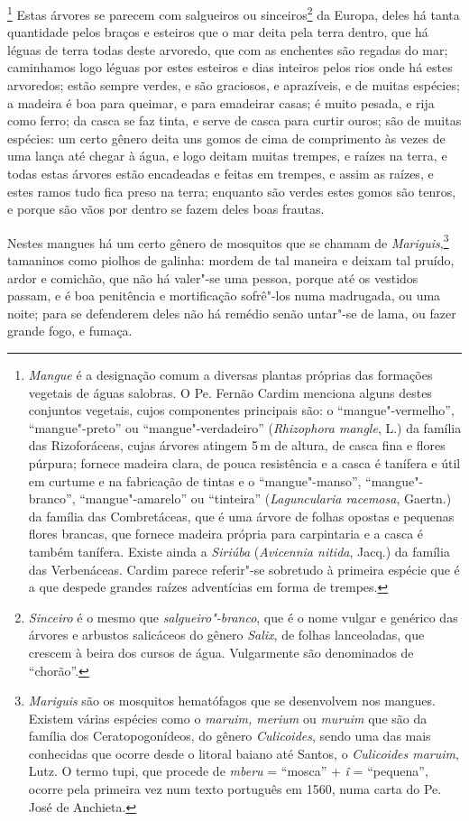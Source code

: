 \footnote{ \textit{Mangue} é a designação
comum a diversas plantas próprias das formações vegetais de águas
salobras. O Pe. Fernão Cardim menciona alguns destes conjuntos
vegetais, cujos componentes principais são: o ``mangue"-vermelho'', 
``mangue"-preto'' ou ``mangue"-verdadeiro'' (\textit{Rhizophora mangle}, L.)
da família das Rizoforáceas, cujas árvores atingem 5\,m de altura, de
casca fina e flores púrpura; fornece madeira clara, de pouca
resistência e a casca é tanífera e útil em curtume e na fabricação de
tintas e o ``mangue"-manso'', ``mangue"-branco'', ``mangue"-amarelo'' ou
``tinteira'' (\textit{Laguncularia racemosa}, Gaertn.) da família das
Combretáceas, que é uma árvore de folhas opostas e pequenas flores
brancas, que fornece madeira própria para carpintaria e a casca é
também tanífera. Existe ainda a \textit{Siriúba} (\textit{Avicennia
nitida}, Jacq.) da família das Verbenáceas. Cardim parece referir"-se
sobretudo à primeira espécie que é a que despede grandes raízes
adventícias em forma de trempes.} Estas árvores se parecem
com salgueiros ou sinceiros\footnote{ \textit{Sinceiro} é o mesmo que
\textit{salgueiro"-branco}, que é o nome vulgar e genérico das árvores e
arbustos salicáceos do gênero \textit{Salix}, de folhas lanceoladas,
que crescem à beira dos cursos de água. Vulgarmente são denominados de
``chorão''.} da Europa, deles há tanta quantidade pelos braços e esteiros
que o mar deita pela terra dentro, que há léguas de terra todas deste
arvoredo, que com as enchentes são regadas do mar; caminhamos logo
léguas por estes esteiros e dias inteiros pelos rios onde há estes
arvoredos; estão sempre verdes, e são graciosos, e aprazíveis, e de
muitas espécies; a madeira é boa para queimar, e para emadeirar casas;
é muito pesada, e rija como ferro; da casca se faz tinta, e serve de
casca para curtir ouros; são de muitas espécies: um certo gênero deita
uns gomos de cima de comprimento às vezes de uma lança até chegar à
água, e logo deitam muitas trempes, e raízes na terra, e todas estas
árvores estão encadeadas e feitas em trempes, e assim as raízes, e
estes ramos tudo fica preso na terra; enquanto são verdes estes gomos
são tenros, e porque são vãos por dentro se fazem deles boas frautas.

 Nestes mangues há um certo gênero de mosquitos que se chamam de
\textit{Mariguis},\footnote{ \textit{Mariguis} são os mosquitos
hematófagos que se desenvolvem nos mangues. Existem várias espécies
como o \textit{maruim, merium} ou \textit{muruim} que são da família
dos Ceratopogonídeos, do gênero \textit{Culicoides}, sendo uma das mais
conhecidas que ocorre desde o litoral baiano até Santos, o
\textit{Culicoides maruim}, Lutz. O termo tupi, que procede de
\textit{mberu} = ``mosca'' + \textit{î} = ``pequena'', ocorre pela primeira
vez num texto português em 1560, numa carta do Pe. José de
Anchieta.} tamaninos como piolhos de galinha: mordem de tal maneira e
deixam tal pruído, ardor e comichão, que não há valer"-se uma pessoa,
porque até os vestidos passam, e é boa penitência e mortificação
sofrê"-los numa madrugada, ou uma noite; para se defenderem deles não há
remédio senão untar"-se de lama, ou fazer grande fogo, e fumaça.

